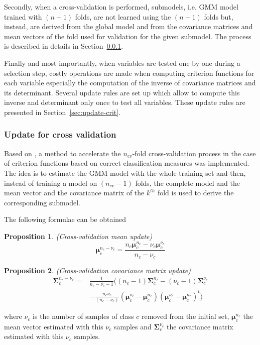 \documentclass[journal,peerreview,onecolumn]{IEEEtran}
\newtheorem{prop}{Proposition}
\begin{document}
    Secondly, when a cross-validation is performed, submodels, i.e. GMM model trained with $(n-1)$ folds, are not learned using the $(n-1)$ folds but, instead, are derived from the global model and from the covariance matrices and mean vectors of the fold used for validation for the given submodel. The process is described in details in Section~\ref{sec:update-cv}.

    Finally and most importantly, when variables are tested one by one during a selection step, costly operations are made when computing criterion functions for each variable especially the computation of the inverse of covariance matrices and its determinant. Several update rules are set up which allow to compute this inverse and determinant only once to test all variables. These update rules are presented in Section~\ref{sec:update-crit}.

        \subsubsection{Update for cross validation}
        \label{sec:update-cv}

        Based on \cite{fauvel2015fast}, a method to accelerate the $n_{cv}$-fold cross-validation process in the case of criterion functions based on correct classification measures was implemented. The idea is to estimate the GMM model with the whole training set and then, instead of training a model on $(n_{cv}-1)$ folds, the complete model and the mean vector and the covariance matrix of the $k^{th}$ fold is used to derive the corresponding submodel.

        The following formulae can be obtained
        \begin{prop}
            \label{eq:update-cv1}
            (Cross-validation mean update)
            \begin{equation*}
                \boldsymbol{\mu}_c^{n_c-\nu_c} = \frac{n_c \boldsymbol{\mu}_c^{n_c} - \nu_c \boldsymbol{\mu}_c^{\nu_c}}{n_c - \nu_c} \nonumber
            \end{equation*}
        \end{prop}
        \begin{prop}
            \label{eq:update-cv2}
            (Cross-validation covariance matrix update)
            \begin{align*}
                \boldsymbol{\Sigma}_c^{n_c-\nu_c} = &\frac{1}{n_c-\nu_c-1} \biggl( (n_c-1) \boldsymbol{\Sigma}_c^{n_c} - (\nu_c-1) \boldsymbol{\Sigma}_c^{\nu_c} \nonumber \\
                &- \frac{n_c \nu_c}{(n_c-\nu_c)} (\boldsymbol{\mu}_c^{\nu_c}-\boldsymbol{\mu}_c^{n_c})(\boldsymbol{\mu}_c^{\nu_c}-\boldsymbol{\mu}_c^{n_c})^t \biggr) \nonumber
            \end{align*}
        \end{prop}
        where $\nu_c$ is the number of samples of class $c$ removed from the initial set, $\boldsymbol{\mu}_c^{n_c}$ the mean vector estimated with this $\nu_c$ samples and $\boldsymbol{\Sigma}_c^{\nu_c}$ the covariance matrix estimated with this $\nu_c$ samples.
\end{document}
